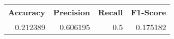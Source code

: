 \begin{tabular}{rrrr}
\toprule
 Accuracy &  Precision &  Recall &  F1-Score \\
\midrule
 0.212389 &   0.606195 &     0.5 &  0.175182 \\
\bottomrule
\end{tabular}
